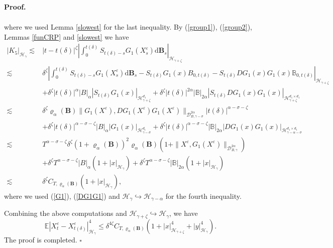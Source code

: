 \documentclass[10pt,a4paper]{article}
\numberwithin{equation}{section}
\newenvironment{proof}[1][\normalfont\bfseries Proof]{%
	\noindent #1.\hspace{0.5em}%
	\ignorespaces%
}{%
	\hfill $\square$%
	\par%
}
\begin{document}
\begin{proof}
\begin{align}
	\end{align}
	where we used Lemma \ref{slowest} for the last inequality.
	By (\ref{group1}), (\ref{group2}), Lemmas \ref{funCRP} and \ref{slowest} we have
	\begin{align}\label{B2}
		|K_5|_{\mathcal H_\gamma }
		\lesssim & |t-t(\delta)|^{\zeta} \left| \int_0^{t(\delta)} S_{t(\delta)-s} G_1(X_s^\varepsilon) \mathrm{d} \mathbf B_s  \right|_{\mathcal H_{\gamma+\zeta} } \nonumber\\
		\lesssim & \delta^\zeta \left| \int_0^{t(\delta)} S_{t(\delta)-s} G_1(X_s^\varepsilon) \mathrm{d} \mathbf B_s -S_{t(\delta)} G_1(x) B_{0,{t(\delta)}}-S_{t(\delta)} DG_1(x)G_1(x)  \mathbb B_{0,{t(\delta)}}  \right|_{\mathcal H_{\gamma+\zeta} } \nonumber\\
		&+\delta^\zeta |t(\delta)|^\alpha |B|_\alpha |S_{t(\delta)} G_1(x)|_{\mathcal H_{\gamma+\zeta}^{d_1} }
		+\delta^\zeta |t(\delta)|^{2\alpha} |\mathbb{B}|_{2\alpha} |S_{t(\delta)} DG_1(x)G_1(x) |_{\mathcal H_{\gamma+\zeta}^{d_1 \times d_1} } \nonumber\\
		\lesssim & \delta^\zeta \varrho_{\alpha}(\mathbf{B}) \|G_1(X^\varepsilon),DG_1(X^\varepsilon)G_1(X^\varepsilon)\|_{\mathcal{D}_{B,\gamma-\sigma}^{2\alpha}} |t(\delta)|^{\alpha-\sigma-\zeta} \nonumber\\
		&+ \delta^\zeta |t(\delta)|^{\alpha-\sigma-\zeta} |B|_\alpha |G_1(x)|_{\mathcal H_{\gamma-\sigma}^{d_1}  }
		+\delta^\zeta |t(\delta)|^{\alpha-\sigma-\zeta} |\mathbb{B}|_{2\alpha}
		|DG_1(x)G_1(x) |_{\mathcal H_{\gamma-\alpha-\sigma}^{d_1 \times d_1} } \nonumber\\
		\lesssim & T^{\alpha-\sigma-\zeta} \delta^\zeta (1+\varrho_{\alpha}(\mathbf{B}))^2 \varrho_{\alpha}(\mathbf{B}) \left(1+\|X^\varepsilon,G_1(X^\varepsilon)\|_{\mathcal{D}_{B,\gamma}^{2\alpha}} \right) \nonumber\\
		&+\delta^\zeta T^{\alpha-\sigma-\zeta} |B|_\alpha (1+|x|_{\mathcal H_\gamma})
		+\delta^\zeta T^{\alpha-\sigma-\zeta} |\mathbb{B}|_{2\alpha} (1+|x|_{\mathcal H_\gamma}) \nonumber\\
		\lesssim & \delta^\zeta C_{T,\varrho_{\alpha}(\mathbf{B})} (1+|x|_{\mathcal H_\gamma}),
	\end{align}
	where we used (\ref{G1}), (\ref{DG1G1}) and $\mathcal H_\gamma \hookrightarrow \mathcal H_{\gamma-\alpha}$ for the fourth inequality.
	
	
	
	
	Combining the above computations and $\mathcal H_{\gamma+\zeta} \hookrightarrow \mathcal H_\gamma$, we have
	\begin{equation*}
		\mathbb E |X_t^\varepsilon-X_{t(\delta)}^\varepsilon|_{\mathcal H_\gamma }^4 \leq \delta^{4\zeta}  C_{T,\varrho_{\alpha}(\mathbf{B})} (1+|x|_{\mathcal H_{\gamma+\zeta} }^4+|y|_{\mathcal H_{\gamma} }^4).
	\end{equation*}
	The proof is completed.
\end{proof}
\end{document}
